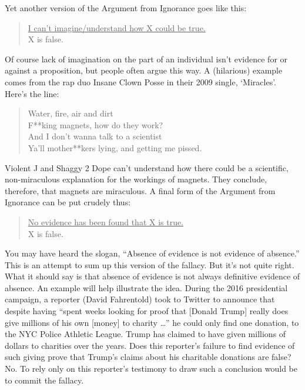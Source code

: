 Yet another version of the Argument from Ignorance goes like this:

\begin{quote}
\underline{I can't imagine/understand how X could be true.} \\
X is false.
\end{quote}

Of course lack of imagination on the part of an individual isn't evidence for or against a
proposition, but people often argue this way. A (hilarious) example comes from the rap duo Insane
Clown Posse in their 2009 single, `Miracles'. Here's the line:

\begin{quote}Water, fire, air and dirt \\
F**king magnets, how do they work? \\
And I don't wanna talk to a scientist \\
Ya'll mother**kers lying, and getting me pissed.
\end{quote}

Violent J and Shaggy 2 Dope can't understand how there could be a scientific, non-miraculous
explanation for the workings of magnets. They conclude, therefore, that magnets are miraculous.
A final form of the Argument from Ignorance can be put crudely thus:

\begin{quote}\underline{No evidence has been found that X is true.} \\
X is false.\end{quote}

You may have heard the slogan, ``Absence of evidence is not evidence of absence.'' This is an
attempt to sum up this version of the fallacy. But it's not quite right. What it should say is that
absence of evidence is not always definitive evidence of absence. An example will help illustrate
the idea. During the 2016 presidential campaign, a reporter (David Fahrentold) took to Twitter to
announce that despite having ``spent weeks looking for proof that [Donald Trump] really does give
millions of his own [money] to charity \dots '' he could only find one donation, to the NYC Police
Athletic League. Trump has claimed to have given millions of dollars to charities over the years.
Does this reporter's failure to find evidence of such giving prove that Trump's claims about his
charitable donations are false? No. To rely only on this reporter's testimony to draw such a
conclusion would be to commit the fallacy.

